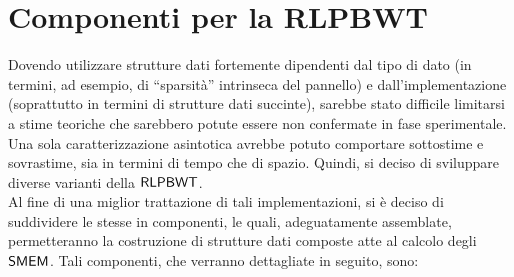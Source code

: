 \section{Componenti per la RLPBWT}
Dovendo utilizzare
strutture dati fortemente dipendenti dal tipo di dato (in termini, ad esempio,
di ``sparsità'' intrinseca del pannello) e dall'implementazione (soprattutto in
termini di strutture dati succinte), sarebbe stato difficile limitarsi a stime
teoriche che sarebbero potute essere non confermate in fase sperimentale. Una
sola caratterizzazione asintotica avrebbe potuto comportare sottostime e
sovrastime, sia in termini di tempo che di spazio. Quindi, si deciso di
sviluppare diverse varianti della $\mbox{\rm {\sf RLPBWT}}$.\\ 
Al fine di una miglior trattazione di tali implementazioni, si è deciso di
suddividere le stesse in componenti, le quali, adeguatamente
assemblate, permetteranno la costruzione di strutture dati composte atte al
calcolo degli $\mbox{\rm {\sf SMEM}}$. Tali componenti, che verranno dettagliate in seguito,
sono: 

